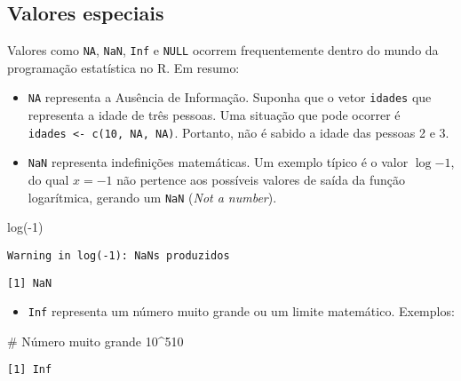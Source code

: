 \documentclass[
  12pt,
  letterpaper,
  DIV=11,
  numbers=noendperiod]{scrreprt}
\newenvironment{Shaded}{\begin{snugshade}}{\end{snugshade}}
\newcommand{\CommentTok}[1]{\textcolor[rgb]{0.37,0.37,0.37}{#1}}
\newcommand{\DecValTok}[1]{\textcolor[rgb]{0.68,0.00,0.00}{#1}}
\newcommand{\FunctionTok}[1]{\textcolor[rgb]{0.28,0.35,0.67}{#1}}
\newcommand{\NormalTok}[1]{\textcolor[rgb]{0.00,0.23,0.31}{#1}}
\newcommand{\SpecialCharTok}[1]{\textcolor[rgb]{0.37,0.37,0.37}{#1}}
\providecommand{\tightlist}{%
  \setlength{\itemsep}{0pt}\setlength{\parskip}{0pt}}\usepackage{longtable,booktabs,array}
\begin{document}
\subsection{Valores especiais}\label{valores-especiais}

Valores como \texttt{NA}, \texttt{NaN}, \texttt{Inf} e \texttt{NULL}
ocorrem frequentemente dentro do mundo da programação estatística no R.
Em resumo:

\begin{itemize}
\tightlist
\item
  \texttt{NA} representa a Ausência de Informação. Suponha que o vetor
  \texttt{idades} que representa a idade de três pessoas. Uma situação
  que pode ocorrer é \texttt{idades\ \textless{}-\ c(10,\ NA,\ NA)}.
  Portanto, não é sabido a idade das pessoas 2 e 3.
\item
  \texttt{NaN} representa indefinições matemáticas. Um exemplo típico é
  o valor \(\log{-1}\), do qual \(x = -1\) não pertence aos possíveis
  valores de saída da função logarítmica, gerando um \texttt{NaN}
  (\emph{Not a number}).
\end{itemize}

\begin{Shaded}
\begin{Highlighting}[]
\FunctionTok{log}\NormalTok{(}\SpecialCharTok{{-}}\DecValTok{1}\NormalTok{)}
\end{Highlighting}
\end{Shaded}

\begin{verbatim}
Warning in log(-1): NaNs produzidos
\end{verbatim}

\begin{verbatim}
[1] NaN
\end{verbatim}

\begin{itemize}
\tightlist
\item
  \texttt{Inf} representa um número muito grande ou um limite
  matemático. Exemplos:
\end{itemize}

\begin{Shaded}
\begin{Highlighting}[]
\CommentTok{\# Número muito grande}
\DecValTok{10}\SpecialCharTok{\^{}}\DecValTok{510}
\end{Highlighting}
\end{Shaded}

\begin{verbatim}
[1] Inf
\end{verbatim}
\end{document}
